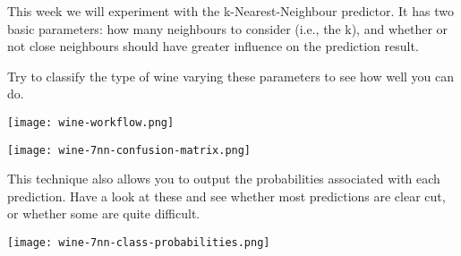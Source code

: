 \documentclass[
  coursecode={CMPE 251},
  assignmentname={Exercise \exercisenumber},
  studentnumber=20053722,
  name={Bryan Hoang}
]{
  ltxanswer%
}
\begin{document}
  \begin{questions}
    \question[2]{}
    This week we will experiment with the k-Nearest-Neighbour predictor. It has two basic parameters: how many neighbours to consider (i.e., the k), and whether or not close neighbours should have greater influence on the prediction result.

    Try to classify the type of wine varying these parameters to see how well you can do.
    \begin{solution}
      \begin{answerfigure}
        \begin{answerfigure}
          \texttt{[image: wine-workflow.png]}
          \label{fig:wine-workflow}
        \end{answerfigure}
        \begin{answerfigure}
          \texttt{[image: wine-7nn-confusion-matrix.png]}
          \label{fig:wine-7nn-confusion-matrix}
        \end{answerfigure}
      \end{answerfigure}
    \end{solution}

    \question[2]{}
    This technique also allows you to output the probabilities associated with each prediction. Have a look at these and see whether most predictions are clear cut, or whether some are quite difficult.
    \begin{solution}
      \begin{answerfigure}
        \texttt{[image: wine-7nn-class-probabilities.png]}
        \label{fig:wine-7nn-class-probabilities}
      \end{answerfigure}
    \end{solution}
  \end{questions}
\end{document}
